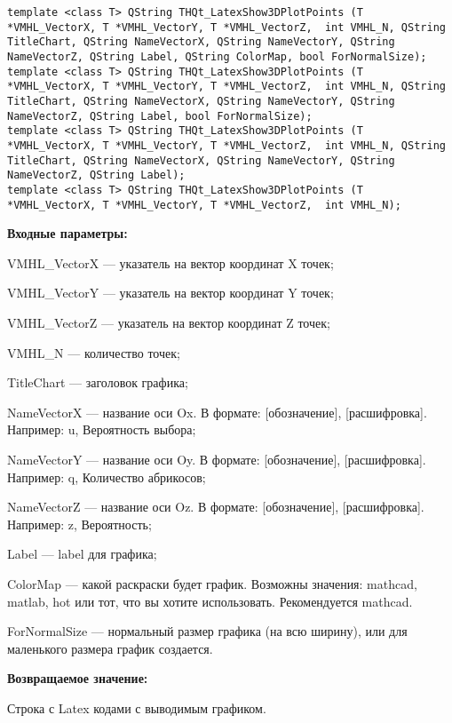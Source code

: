\documentclass[a4paper,12pt]{article}
\begin{document}
\begin{lstlisting}[label=code_syntax_THQt_LatexShow3DPlotPoints,caption=Синтаксис]
template <class T> QString THQt_LatexShow3DPlotPoints (T *VMHL_VectorX, T *VMHL_VectorY, T *VMHL_VectorZ,  int VMHL_N, QString TitleChart, QString NameVectorX, QString NameVectorY, QString NameVectorZ, QString Label, QString ColorMap, bool ForNormalSize);
template <class T> QString THQt_LatexShow3DPlotPoints (T *VMHL_VectorX, T *VMHL_VectorY, T *VMHL_VectorZ,  int VMHL_N, QString TitleChart, QString NameVectorX, QString NameVectorY, QString NameVectorZ, QString Label, bool ForNormalSize);
template <class T> QString THQt_LatexShow3DPlotPoints (T *VMHL_VectorX, T *VMHL_VectorY, T *VMHL_VectorZ,  int VMHL_N, QString TitleChart, QString NameVectorX, QString NameVectorY, QString NameVectorZ, QString Label);
template <class T> QString THQt_LatexShow3DPlotPoints (T *VMHL_VectorX, T *VMHL_VectorY, T *VMHL_VectorZ,  int VMHL_N);
\end{lstlisting}

\textbf{Входные параметры:}
 

VMHL\_VectorX --- указатель на вектор координат X точек;
 
    VMHL\_VectorY --- указатель на вектор координат Y точек;
 
    VMHL\_VectorZ --- указатель на вектор координат Z точек;
 
    VMHL\_N --- количество точек;
 
    TitleChart --- заголовок графика;
 
    NameVectorX --- название оси Ox. В формате: [обозначение], [расшифровка]. Например: u, Вероятность выбора;
 
    NameVectorY --- название оси Oy. В формате: [обозначение], [расшифровка]. Например: q, Количество абрикосов;
 
    NameVectorZ --- название оси Oz. В формате: [обозначение], [расшифровка]. Например: z, Вероятность;
 
    Label --- label для графика;
 
    ColorMap --- какой раскраски будет график. Возможны значения: mathcad, matlab, hot или тот, что вы хотите использовать. Рекомендуется mathcad.
 
    ForNormalSize --- нормальный размер графика (на всю ширину), или для маленького размера график создается.
	
\textbf{Возвращаемое значение:}

Строка с Latex кодами с выводимым графиком.
\end{document}
